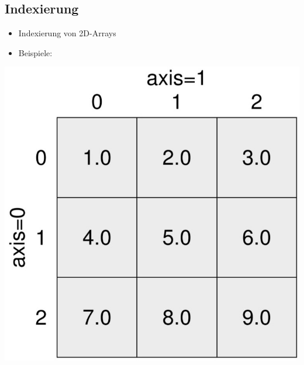 \subsection{Indexierung}
\begin{multicols}{2}
	\begin{itemize}
		\item Indexierung von 2D-Arrays\\
		
		\item Beispiele:\\
		
	\end{itemize}
	\columnbreak
	\includegraphics[width=0.7\linewidth]{images/v8_numpy1}
\end{multicols}

